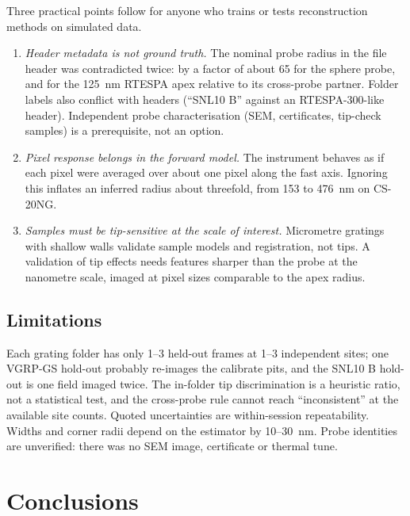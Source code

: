 \documentclass[preprint,12pt]{elsarticle}
\begin{document}
Three practical points follow for anyone who trains or tests reconstruction methods on simulated
data.
\begin{enumerate}
  \item \emph{Header metadata is not ground truth.} The nominal probe radius in the file header was
        contradicted twice: by a factor of about 65 for the sphere probe, and for the 125~nm
        RTESPA apex relative to its cross-probe partner. Folder labels also conflict with headers
        (``SNL10 B'' against an RTESPA-300-like header). Independent probe characterisation
        (SEM, certificates, tip-check samples) is a prerequisite, not an option.
  \item \emph{Pixel response belongs in the forward model.} The instrument behaves as if each
        pixel were averaged over about one pixel along the fast axis. Ignoring this inflates an
        inferred radius about threefold, from 153 to 476~nm on CS-20NG.
  \item \emph{Samples must be tip-sensitive at the scale of interest.} Micrometre gratings with
        shallow walls validate sample models and registration, not tips. A validation of tip
        effects needs features sharper than the probe at the nanometre scale, imaged at pixel
        sizes comparable to the apex radius.
\end{enumerate}

\subsection{Limitations}

Each grating folder has only 1--3 held-out frames at 1--3 independent sites; one VGRP-GS hold-out
probably re-images the calibrate pits, and the SNL10 B hold-out is one field imaged twice. The
in-folder tip discrimination is a heuristic ratio, not a statistical test, and the cross-probe
rule cannot reach ``inconsistent'' at the available site counts. Quoted uncertainties are
within-session repeatability. Widths and corner radii depend on the estimator by 10--30~nm. Probe
identities are unverified: there was no SEM image, certificate or thermal tune.

\section{Conclusions}
\label{sec:conclusions}
\end{document}
